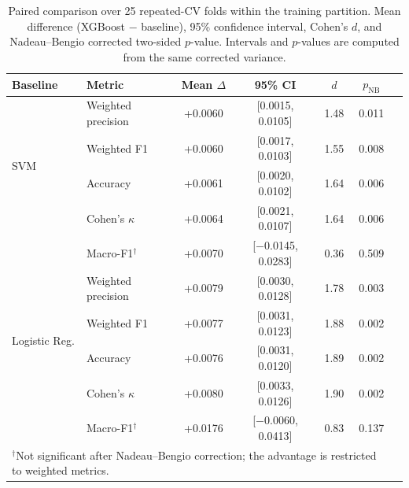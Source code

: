 \begin{table}[htbp]
\caption{Paired comparison over 25 repeated-CV folds within the training
partition. Mean difference (XGBoost $-$ baseline), 95\% confidence interval,
Cohen's $d$, and Nadeau--Bengio corrected two-sided $p$-value. Intervals and
$p$-values are computed from the same corrected variance.}
\label{tab:wilcoxon}
\centering
\footnotesize
\begin{tabular}{llccccc}
\toprule
Baseline & Metric & Mean $\Delta$ & 95\% CI & $d$ & $p_{\mathrm{NB}}$ \\
\midrule
\multirow{4}{*}{SVM}
 & Weighted precision & +0.0060 & [0.0015, 0.0105] & 1.48 & 0.011 \\
 & Weighted F1        & +0.0060 & [0.0017, 0.0103] & 1.55 & 0.008 \\
 & Accuracy           & +0.0061 & [0.0020, 0.0102] & 1.64 & 0.006 \\
 & Cohen's $\kappa$   & +0.0064 & [0.0021, 0.0107] & 1.64 & 0.006 \\
 & Macro-F1$^{\dagger}$ & +0.0070 & [$-$0.0145, 0.0283] & 0.36 & 0.509 \\
\midrule
\multirow{4}{*}{Logistic Reg.}
 & Weighted precision & +0.0079 & [0.0030, 0.0128] & 1.78 & 0.003 \\
 & Weighted F1        & +0.0077 & [0.0031, 0.0123] & 1.88 & 0.002 \\
 & Accuracy           & +0.0076 & [0.0031, 0.0120] & 1.89 & 0.002 \\
 & Cohen's $\kappa$   & +0.0080 & [0.0033, 0.0126] & 1.90 & 0.002 \\
 & Macro-F1$^{\dagger}$ & +0.0176 & [$-$0.0060, 0.0413] & 0.83 & 0.137 \\
\bottomrule
\multicolumn{6}{p{0.95\columnwidth}}{\footnotesize $^{\dagger}$Not significant after
Nadeau--Bengio correction; the advantage is restricted to weighted metrics.}
\end{tabular}
\end{table}


